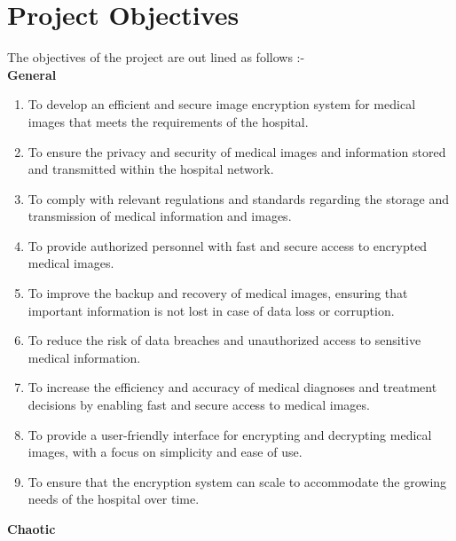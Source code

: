 \documentclass[12pt,a4paper,english]{article}
\begin{document}
\section{Project Objectives}
The objectives of the project are out lined as follows :-\\
\newline
\textbf{General}\\
\begin{enumerate}
    \item To develop an efficient and secure image encryption system for medical images that meets the requirements of the hospital.

    \item To ensure the privacy and security of medical images and information stored and transmitted within the hospital network.

    \item To comply with relevant regulations and standards regarding the storage and transmission of medical information and images.

    \item To provide authorized personnel with fast and secure access to encrypted medical images.

    \item To improve the backup and recovery of medical images, ensuring that important information is not lost in case of data loss or corruption.

    \item To reduce the risk of data breaches and unauthorized access to sensitive medical information.

    \item To increase the efficiency and accuracy of medical diagnoses and treatment decisions by enabling fast and secure access to medical images.

    \item To provide a user-friendly interface for encrypting and decrypting medical images, with a focus on simplicity and ease of use.

    \item To ensure that the encryption system can scale to accommodate the growing needs of the hospital over time.\newpage
\end{enumerate}
\textbf{Chaotic}
\end{document}
